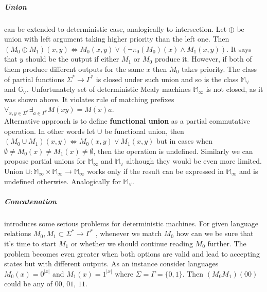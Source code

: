\documentclass[12pt]{article}
\begin{document}
\subparagraph{Union}  can be extended to deterministic case, analogically to intersection. Let $\oplus$ be union with left argument taking higher priority than the left one. Then $(M_0 \oplus M_1)(x,y) \iff M_0(x,y) \vee (\neg \pi_0(M_0)(x) \wedge M_1(x,y))$. It says that $y$ should be the output if either $M_1$ or $M_0$ produce it. However, if both of them produce different outputs for the same $x$ then $M_0$ takes priority. The class of partial functions $\Sigma^* \rightarrow \Gamma^*$ is closed  under such union and so is the class $\mathbb{M}_\vee$ and $\mathbb{G}_\vee$. Unfortunately set of deterministic Mealy machines $\mathbb{ M}_\infty$ is not closed, as it was shown above. It violates rule of matching prefixes $\forall_{x,y\in \Sigma^*} \exists_{a \in \Gamma^* } M(xy)=M(x)a$.  \\
Alternative approach is to define \textbf{functional union} as a partial commutative operation. In other words let $\cup$ be functional union, then $(M_0 \cup M_1 )(x,y) \iff M_0(x,y) \vee M_1(x,y)$ but in cases when $\emptyset \ne M_0(x) \ne M_1(x) \ne \emptyset$, then the operation is undefined. Similarly we can propose partial unions for $\mathbb{ M}_\infty$ and $\mathbb{ M}_\vee$ although they would be even more limited. Union $\cup : \mathbb{ M}_\infty \times \mathbb{ M}_\infty \rightarrow \mathbb{ M}_\infty$ works only if the result can be expressed in $\mathbb{ M}_\infty $ and is undefined otherwise. Analogically for $\mathbb{ M}_\vee$.



\subparagraph{Concatenation}  introduces some serious problems for deterministic machines. For given language relations $M_0,M_1 \subset \Sigma^* \rightarrow \Gamma^* $ , whenever we match $M_0$ how can we be sure that it's time to start $M_1$ or whether we should continue reading $M_0$ further. The problem becomes even greater when both options are valid and lead to accepting states but with different outputs. As an instance consider languages $M_0(x) =  0^{\vert x \vert} $ and $M_1(x) =  1^{\vert x \vert} $ where $\Sigma=\Gamma=\{0,1\}$. Then $(M_0M_1)(00)$ could be any of $00$, $01$, $11$. 
\end{document}
